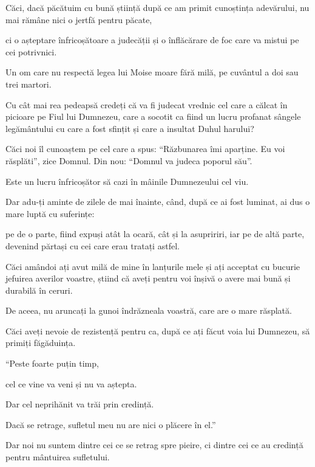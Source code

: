 {\par }{\PP {}Căci, dacă păcătuim cu bună știință după ce am primit cunoștința adevărului, nu mai rămâne nici o jertfă pentru păcate,

ci o așteptare înfricoșătoare a judecății și o înflăcărare de foc care va mistui pe cei potrivnici.

Un om care nu respectă legea lui Moise moare fără milă, pe cuvântul a doi sau trei martori.

Cu cât mai rea pedeapsă credeți că va fi judecat vrednic cel care a călcat în picioare pe Fiul lui Dumnezeu, care a socotit ca fiind un lucru profanat sângele legământului cu care a fost sfințit și care a insultat Duhul harului?

Căci noi îl cunoaștem pe cel care a spus: “Răzbunarea îmi aparține. Eu voi răsplăti”, zice Domnul. Din nou: “Domnul va judeca poporul său”.

Este un lucru înfricoșător să cazi în mâinile Dumnezeului cel viu.


\par }{\PP {}Dar adu-ți aminte de zilele de mai înainte, când, după ce ai fost luminat, ai dus o mare luptă cu suferințe:

pe de o parte, fiind expuși atât la ocară, cât și la asupririri, iar pe de altă parte, devenind părtași cu cei care erau tratați astfel.

Căci amândoi ați avut milă de mine în lanțurile mele și ați acceptat cu bucurie jefuirea averilor voastre, știind că aveți pentru voi înșivă o avere mai bună și durabilă în ceruri.

De aceea, nu aruncați la gunoi îndrăzneala voastră, care are o mare răsplată.

Căci aveți nevoie de rezistență pentru ca, după ce ați făcut voia lui Dumnezeu, să primiți făgăduința.


\par }{\Q {}“Peste foarte puțin timp,

\par }{\QB cel ce vine va veni și nu va aștepta.


\par }{\Q {}Dar cel neprihănit va trăi prin credință.

\par }{\QB Dacă se retrage, sufletul meu nu are nici o plăcere în el.”


\par }{\PP {}Dar noi nu suntem dintre cei ce se retrag spre pieire, ci dintre cei ce au credință pentru mântuirea sufletului.



}
